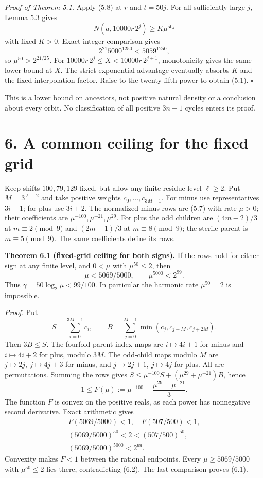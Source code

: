 \documentclass[11pt,a4paper]{article}
\begin{document}
\emph{Proof of Theorem 5.1.} Apply (5.8) at \(r\) and \(t=50j\). For all
sufficiently large \(j\), Lemma 5.3 gives \[
N(a,10000r\,2^j)\ge K\mu^{50j}
\] with fixed \(K>0\). Exact integer comparison gives \[
2^{21}5000^{1250}<5059^{1250},
\tag{5.9}
\] so \(\mu^{50}>2^{21/25}\). For \(10000r\,2^j\le X<10000r\,2^{j+1}\),
monotonicity gives the same lower bound at \(X\). The strict exponential
advantage eventually absorbs \(K\) and the fixed interpolation factor.
Raise to the twenty-fifth power to obtain (5.1). \(\square\)

This is a lower bound on ancestors, not positive natural density or a
conclusion about every orbit. No classification of all positive \(3n-1\)
cycles enters its proof.

\section{6. A common ceiling for the fixed
grid}\label{a-common-ceiling-for-the-fixed-grid}

Keep shifts \(100,79,129\) fixed, but allow any finite residue level
\(\ell\ge2\). Put \(M=3^{\ell-2}\) and take positive weights
\(c_0,\ldots,c_{3M-1}\). For minus use representatives \(3i+1\); for
plus use \(3i+2\). The normalized minus rows are (5.7) with rate
\(\mu>0\); their coefficients are \(\mu^{-100},\mu^{-21},\mu^{29}\). For
plus the odd children are \((4m-2)/3\) at \(m\equiv2\pmod9\) and
\((2m-1)/3\) at \(m\equiv8\pmod9\); the sterile parent is
\(m\equiv5\pmod9\). The same coefficients define its rows.

\textbf{Theorem 6.1 (fixed-grid ceiling for both signs).} If the rows
hold for either sign at any finite level, and \(0<\mu\) with
\(\mu^{50}\le2\), then \[
\mu<5069/5000,\qquad \mu^{5000}<2^{99}.
\tag{6.1}
\] Thus \(\gamma=50\log_2\mu<99/100\). In particular the harmonic rate
\(\mu^{50}=2\) is impossible.

\emph{Proof.} Put \[
S=\sum_{i=0}^{3M-1}c_i,\qquad
B=\sum_{j=0}^{M-1}\min(c_j,c_{j+M},c_{j+2M}).
\] Then \(3B\le S\). The fourfold-parent index maps are \(i\mapsto4i+1\)
for minus and \(i\mapsto4i+2\) for plus, modulo \(3M\). The odd-child
maps modulo \(M\) are \(j\mapsto2j,\ j\mapsto4j+3\) for minus, and
\(j\mapsto2j+1,\ j\mapsto4j\) for plus. All are permutations. Summing
the rows gives \(S\le\mu^{-100}S+(\mu^{29}+\mu^{-21})B\), hence \[
1\le F(\mu):=\mu^{-100}+\frac{\mu^{29}+\mu^{-21}}3.
\tag{6.2}
\] The function \(F\) is convex on the positive reals, as each power has
nonnegative second derivative. Exact arithmetic gives \[
\begin{gathered}
F(5069/5000)<1,\quad F(507/500)<1,\\
(5069/5000)^{50}<2<(507/500)^{50},\\
(5069/5000)^{5000}<2^{99}.
\end{gathered}
\tag{6.3}
\] Convexity makes \(F<1\) between the rational endpoints. Every
\(\mu\ge5069/5000\) with \(\mu^{50}\le2\) lies there, contradicting
(6.2). The last comparison proves (6.1).
\end{document}
